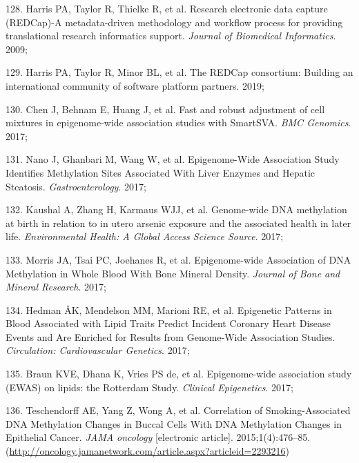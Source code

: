 \documentclass[11pt,oneside]{bristolthesis}
\newenvironment{cslreferences}%
  {}%
  {\par}
\begin{document}
\begin{cslreferences}
\leavevmode\hypertarget{ref-Harris2009}{}%
128. Harris PA, Taylor R, Thielke R, et al. Research electronic data capture (REDCap)-A metadata-driven methodology and workflow process for providing translational research informatics support. \emph{Journal of Biomedical Informatics}. 2009;

\leavevmode\hypertarget{ref-Harris2019}{}%
129. Harris PA, Taylor R, Minor BL, et al. The REDCap consortium: Building an international community of software platform partners. 2019;

\leavevmode\hypertarget{ref-Chen2017}{}%
130. Chen J, Behnam E, Huang J, et al. Fast and robust adjustment of cell mixtures in epigenome-wide association studies with SmartSVA. \emph{BMC Genomics}. 2017;

\leavevmode\hypertarget{ref-Nano2017}{}%
131. Nano J, Ghanbari M, Wang W, et al. Epigenome-Wide Association Study Identifies Methylation Sites Associated With Liver Enzymes and Hepatic Steatosis. \emph{Gastroenterology}. 2017;

\leavevmode\hypertarget{ref-Kaushal2017}{}%
132. Kaushal A, Zhang H, Karmaus WJJ, et al. Genome-wide DNA methylation at birth in relation to in utero arsenic exposure and the associated health in later life. \emph{Environmental Health: A Global Access Science Source}. 2017;

\leavevmode\hypertarget{ref-Morris2017}{}%
133. Morris JA, Tsai PC, Joehanes R, et al. Epigenome-wide Association of DNA Methylation in Whole Blood With Bone Mineral Density. \emph{Journal of Bone and Mineral Research}. 2017;

\leavevmode\hypertarget{ref-Hedman2017}{}%
134. Hedman ÅK, Mendelson MM, Marioni RE, et al. Epigenetic Patterns in Blood Associated with Lipid Traits Predict Incident Coronary Heart Disease Events and Are Enriched for Results from Genome-Wide Association Studies. \emph{Circulation: Cardiovascular Genetics}. 2017;

\leavevmode\hypertarget{ref-Braun2017}{}%
135. Braun KVE, Dhana K, Vries PS de, et al. Epigenome-wide association study (EWAS) on lipids: the Rotterdam Study. \emph{Clinical Epigenetics}. 2017;

\leavevmode\hypertarget{ref-Teschendorff2015}{}%
136. Teschendorff AE, Yang Z, Wong A, et al. Correlation of Smoking-Associated DNA Methylation Changes in Buccal Cells With DNA Methylation Changes in Epithelial Cancer. \emph{JAMA oncology} {[}electronic article{]}. 2015;1(4):476--85. (\url{http://oncology.jamanetwork.com/article.aspx?articleid=2293216})


\end{cslreferences}
\end{document}
